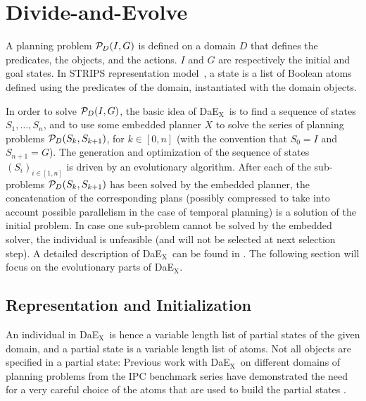 \documentclass{llncs}
\def\DAEX{{\sc DaE$_{\text{X}}$}}
\begin{document}
\section{Divide-and-Evolve}
\label{sec:dae}
A planning problem ${\cal P}_D(I,G)$ is defined on a domain $D$ that defines the predicates, the objects, and the actions. $I$ and $G$ are respectively the initial and goal states. In STRIPS representation model~\cite{Fikes1971}, a state is a list of Boolean atoms defined using the predicates of the domain, instantiated with the domain objects.  

In order to solve  ${\cal P}_D(I,G)$, the basic idea of \DAEX\ is to find a sequence of states $S_1, \ldots, S_n$, and to use some embedded planner $X$ to solve the series of planning problems ${\cal P}_D(S_{k},S_{k+1})$, for $k \in [0,n]$ (with the convention that $S_0 = I$ and $S_{n+1} = G$).
The generation and optimization of the sequence of states $(S_i)_{i \in [1,n]}$  is driven by an evolutionary algorithm. After each of the sub-problems ${\cal P}_D(S_{k},S_{k+1})$ has been solved by the embedded planner, the concatenation of the corresponding plans (possibly compressed to take into account possible parallelism in the case of temporal planning) is a solution of the initial problem. In case one sub-problem cannot be solved by the embedded solver, the individual is unfeasible (and will not be selected at next selection step). A detailed description of \DAEX\ can be found in \cite{Bibai2010}. The following section will focus on the evolutionary parts of \DAEX.

\subsection{Representation and Initialization}
An individual in \DAEX\ is hence a  variable length list of partial states of the given domain, and a partial state is a variable length list of atoms. Not all objects are specified in a partial state:
Previous work with \DAEX\ on different domains of planning problems from the
IPC benchmark series have demonstrated the need for a very careful choice of the atoms that are used to build the partial states \cite{bibaiIPC6,bibai-EvoCOP2010}. 
\end{document}
